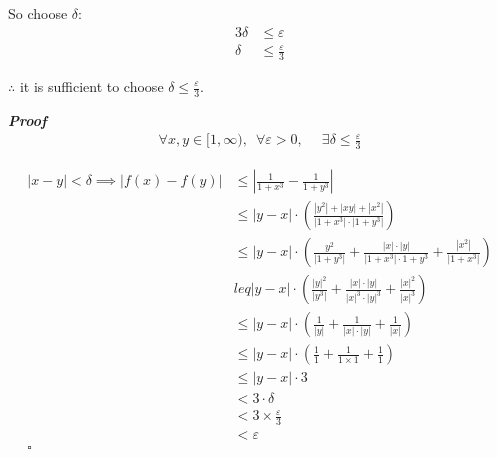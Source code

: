 \documentclass[class=article, crop=false]{standalone}
\begin{document}
 So choose \(\delta\):
\begin{align*}
3\delta &\leq \varepsilon\\
\delta &\leq \frac{\varepsilon}{3}
\end{align*}

\(\therefore\) it is sufficient to choose
\(\delta\leq \frac{\varepsilon}{3}\).

\textbf{\emph{Proof}}
\begin{align*}
  \forall x,y \in [1,\infty), \enspace \forall \varepsilon>0,& \enspace \exists \delta \leq \frac{\varepsilon}{3}
\end{align*}

\begin{align*}
  \left| x- y \right| < \delta  \implies      \left| f\left( x \right) - f\left( y \right)  \right| &\leq     \left| \frac{1}{1+ x^3} - \frac{1}{1+ y^3} \right| \\
  &\leq     \left| y- x  \right| \cdot \left( \frac{    \left| y^2 \right| +     \left| xy \right| +     \left| x^2 \right| }{    \left| 1+ x^3 \right| \cdot     \left| 1+ y^3 \right| } \right) \\
  &\leq     \left| y- x \right| \cdot \left( \frac{y^2}{    \left| 1+ y^3 \right| } +  \frac{    \left| x \right| \cdot     \left| y \right| }{    \left| 1+ x^3 \right| \cdot 1+ y^3} +  \frac{    \left| x^2 \right| }{    \left| 1+ x^3 \right| } \right) \\
  &leq     \left| y- x \right| \cdot \left( \frac{    \left| y \right| ^2}{    \left| y^3 \right| } +  \frac{    \left| x \right| \cdot     \left| y \right| }{    \left| x \right| ^3\cdot     \left| y \right| ^3} +  \frac{    \left| x \right| ^2}{    \left| x \right| ^3} \right) \\
  &\leq     \left| y- x \right| \cdot \left( \frac{1}{    \left| y \right| } + \frac{1}{    \left| x \right| \cdot     \left| y \right| }+ \frac{1}{    \left| x \right| } \right) \\
  &\leq     \left| y- x \right| \cdot \left(\frac{1}{1}+ \frac{1}{1\times 1}+ \frac{1}{1} \right) \\
  &\leq     \left| y- x \right| \cdot 3\\
  &< 3\cdot \delta\\
  &<3\times \frac{\varepsilon}{3}\\
&<\varepsilon\\
\square
\end{align*}
\end{document}
